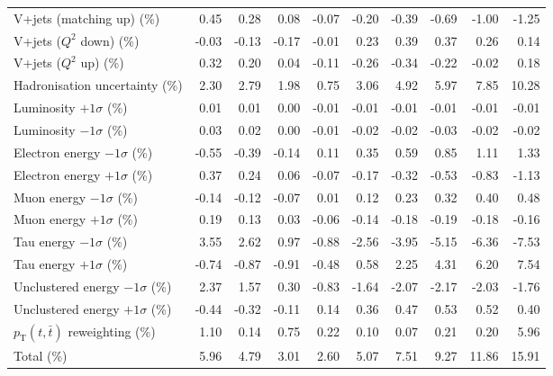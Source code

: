 \begin{table}[htbp]
{\begin{tabular}{lrrrrrrrrr}
V+jets (matching up) (\%) & 0.45 & 0.28 & 0.08 & -0.07 & -0.20 & -0.39 & -0.69 & -1.00 & -1.25 \\ 
V+jets ($Q^{2}$ down) (\%) & -0.03 & -0.13 & -0.17 & -0.01 & 0.23 & 0.39 & 0.37 & 0.26 & 0.14 \\ 
V+jets ($Q^{2}$ up) (\%) & 0.32 & 0.20 & 0.04 & -0.11 & -0.26 & -0.34 & -0.22 & -0.02 & 0.18 \\ 
Hadronisation uncertainty (\%) & 2.30 & 2.79 & 1.98 & 0.75 & 3.06 & 4.92 & 5.97 & 7.85 & 10.28 \\ 
Luminosity $+1\sigma$ (\%) & 0.01 & 0.01 & 0.00 & -0.01 & -0.01 & -0.01 & -0.01 & -0.01 & -0.01 \\ 
Luminosity $-1\sigma$ (\%) & 0.03 & 0.02 & 0.00 & -0.01 & -0.02 & -0.02 & -0.03 & -0.02 & -0.02 \\ 
Electron energy $-1\sigma$ (\%) & -0.55 & -0.39 & -0.14 & 0.11 & 0.35 & 0.59 & 0.85 & 1.11 & 1.33 \\ 
Electron energy $+1\sigma$ (\%) & 0.37 & 0.24 & 0.06 & -0.07 & -0.17 & -0.32 & -0.53 & -0.83 & -1.13 \\ 
Muon energy $-1\sigma$ (\%) & -0.14 & -0.12 & -0.07 & 0.01 & 0.12 & 0.23 & 0.32 & 0.40 & 0.48 \\ 
Muon energy $+1\sigma$ (\%) & 0.19 & 0.13 & 0.03 & -0.06 & -0.14 & -0.18 & -0.19 & -0.18 & -0.16 \\ 
Tau energy $-1\sigma$ (\%) & 3.55 & 2.62 & 0.97 & -0.88 & -2.56 & -3.95 & -5.15 & -6.36 & -7.53 \\ 
Tau energy $+1\sigma$ (\%) & -0.74 & -0.87 & -0.91 & -0.48 & 0.58 & 2.25 & 4.31 & 6.20 & 7.54 \\ 
Unclustered energy $-1\sigma$ (\%) & 2.37 & 1.57 & 0.30 & -0.83 & -1.64 & -2.07 & -2.17 & -2.03 & -1.76 \\ 
Unclustered energy $+1\sigma$ (\%) & -0.44 & -0.32 & -0.11 & 0.14 & 0.36 & 0.47 & 0.53 & 0.52 & 0.40 \\ 
$p_\mathrm{T}(t,\bar{t})$ reweighting (\%) & 1.10 & 0.14 & 0.75 & 0.22 & 0.10 & 0.07 & 0.21 & 0.20 & 5.96 \\ 
\hline 
Total (\%) & 5.96  & 4.79  & 3.01  & 2.60  & 5.07  & 7.51  & 9.27  & 11.86  & 15.91 \\ 
\hline 
\end{tabular}
}
\end{table}
